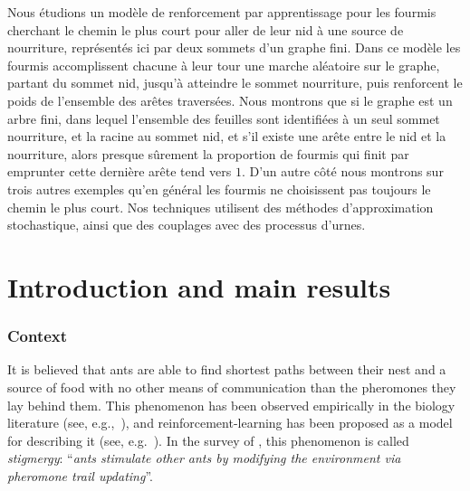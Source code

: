 \documentclass[JEP,XML,SOM,Unicode,NoFloatCountersInSection,published]{cedram}
\numberwithin{equation}{section}
\theoremstyle{definition}
\begin{document}

\begin{altabstract}
Nous étudions un modèle de renforcement par apprentissage pour les fourmis cherchant le chemin le plus court pour aller de leur nid à une source de nourriture, représentés ici par deux sommets d’un graphe fini. Dans ce modèle les fourmis accomplissent chacune à leur tour une marche aléatoire sur le graphe, partant du sommet nid, jusqu’à atteindre le sommet nourriture, puis renforcent le poids de l’ensemble des arêtes traversées. Nous montrons que si le graphe est un arbre fini, dans lequel l’ensemble des feuilles sont identifiées à un seul sommet nourriture, et la racine au sommet nid, et s’il existe une arête entre le nid et la nourriture, alors presque sûrement la proportion de fourmis qui finit par emprunter cette dernière arête tend vers $1$. D’un autre côté nous montrons sur trois autres exemples qu’en général les fourmis ne choisissent pas toujours le chemin le plus court. Nos techniques utilisent des méthodes d’approximation stochastique, ainsi que des couplages avec des processus d'urnes.
\end{altabstract}
\maketitle

\vspace*{-\baselineskip}
\tableofcontents


\section{Introduction and main results}
\subsubsection*{Context}
It is believed that ants are able to find shortest paths between their nest and a source of food
with no other means of communication than the pheromones they lay behind them.
This phenomenon has been observed empirically in the biology literature
(see, e.g.,~\cite{ants_89, Deneu90, current_ants}), and reinforcement-learning has been proposed as a model for {describing it} (see, e.g.~\cite{current_ants}).
In the survey of \cite[Ch.\,1]{book_ant}, this phenomenon is called \emph{stigmergy}: ``\emph{ants stimulate other ants by modifying the environment via pheromone trail updating}''.
\end{document}
